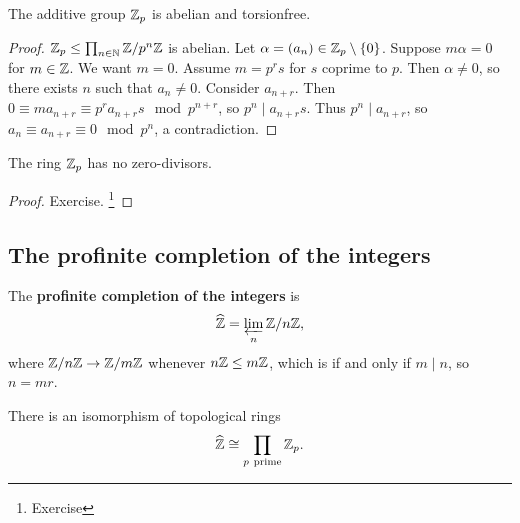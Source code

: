 \begin{proposition}
The additive group $ \mathbb{Z}_p $ is abelian and torsionfree.
\end{proposition}

\begin{proof}
$ \mathbb{Z}_p \le \prod_{n \in \mathbb{N}} \mathbb{Z} / p^n\mathbb{Z} $ is abelian. Let $ \alpha = \br{a_n} \in \ZZ_p \setminus \cbr{0} $. Suppose $ m\alpha = 0 $ for $ m \in \mathbb{Z} $. We want $ m = 0 $. Assume $ m = p^rs $ for $ s $ coprime to $ p $. Then $ \alpha \ne 0 $, so there exists $ n $ such that $ a_n \ne 0 $. Consider $ a_{n + r} $. Then $ 0 \equiv ma_{n + r} \equiv p^ra_{n + r}s \mod p^{n + r} $, so $ p^n \mid a_{n + r}s $. Thus $ p^n \mid a_{n + r} $, so $ a_n \equiv a_{n + r} \equiv 0 \mod p^n $, a contradiction.
\end{proof}

\pagebreak

\begin{proposition}
The ring $ \mathbb{Z}_p $ has no zero-divisors.
\end{proposition}

\begin{proof}
Exercise. \footnote{Exercise}
\end{proof}

\subsection{The profinite completion of the integers}

The \textbf{profinite completion of the integers} is
$$ \widehat{\mathbb{Z}} = \varprojlim_n \mathbb{Z} / n\mathbb{Z}, $$
where $ \mathbb{Z} / n\mathbb{Z} \to \mathbb{Z} / m\mathbb{Z} $ whenever $ n\mathbb{Z} \le m\mathbb{Z} $, which is if and only if $ m \mid n $, so $ n = mr $.

\begin{theorem}
There is an isomorphism of topological rings
$$ \widehat{\mathbb{Z}} \cong \prod_{p \ \text{prime}} \mathbb{Z}_p. $$
\end{theorem}

